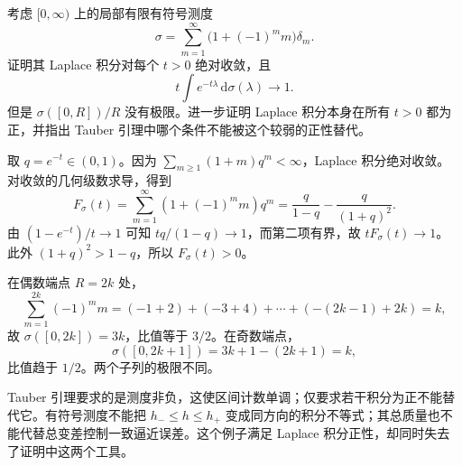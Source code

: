 \begin{exercise}\label{g3:ex:tauber-positivity-essential}
	考虑 \([0,\infty)\) 上的局部有限有符号测度
	\[
		\sigma=\sum_{m=1}^\infty\bigl(1+(-1)^m m\bigr)\delta_m.
	\]
	证明其 Laplace 积分对每个 \(t>0\) 绝对收敛，且
	\[
		t\int e^{-t\lambda}\,\mathrm d\sigma(\lambda)\longrightarrow1.
	\]
	但是 \(\sigma([0,R])/R\) 没有极限。进一步证明 Laplace 积分本身在所有 \(t>0\) 都为正，并指出 Tauber 引理中哪个条件不能被这个较弱的正性替代。
\end{exercise}
\begin{solution}
	取 \(q=e^{-t}\in(0,1)\)。因为
	\(\sum_{m\ge1}(1+m)q^m<\infty\)，Laplace 积分绝对收敛。
	对收敛的几何级数求导，得到
	\[
		F_\sigma(t)=\sum_{m=1}^\infty(1+(-1)^m m)q^m
		=\frac q{1-q}-\frac q{(1+q)^2}.
	\]
	由 \((1-e^{-t})/t\to1\) 可知 \(tq/(1-q)\to1\)，而第二项有界，故 \(tF_\sigma(t)\to1\)。
	此外 \((1+q)^2>1-q\)，所以 \(F_\sigma(t)>0\)。

	在偶数端点 \(R=2k\) 处，
	\[
		\sum_{m=1}^{2k}(-1)^m m
		=(-1+2)+(-3+4)+\cdots+(-(2k-1)+2k)=k,
	\]
	故 \(\sigma([0,2k])=3k\)，比值等于 \(3/2\)。在奇数端点，
	\[
		\sigma([0,2k+1])
		=3k+1-(2k+1)=k,
	\]
	比值趋于 \(1/2\)。两个子列的极限不同。

	Tauber 引理要求的是测度非负，这使区间计数单调；仅要求若干积分为正不能替代它。有符号测度不能把 \(h_-\le h\le h_+\) 变成同方向的积分不等式；其总质量也不能代替总变差控制一致逼近误差。这个例子满足 Laplace 积分正性，却同时失去了证明中这两个工具。
\end{solution}

